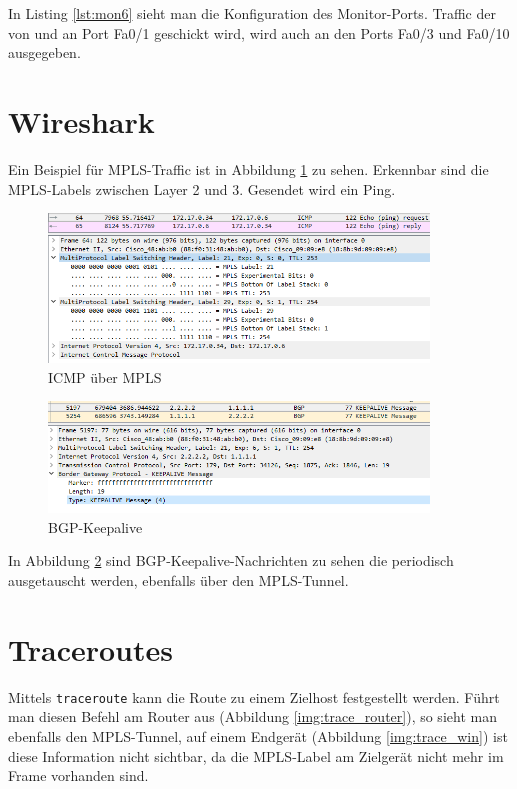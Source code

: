 In Listing \ref{lst:mon6} sieht man die Konfiguration des Monitor-Ports. Traffic der von und an Port Fa0/1 geschickt wird, wird auch an den Ports Fa0/3 und Fa0/10 ausgegeben.

\section{Wireshark}

Ein Beispiel für \ac{MPLS}-Traffic ist in Abbildung \ref{img:icmp} zu sehen. Erkennbar sind die MPLS-Labels zwischen Layer 2 und 3. Gesendet wird ein Ping.

\begin{figure}[H]
	\centering
	\includegraphics[width=0.9\textwidth]{img/icmp_wireshark.png}
	\caption{ICMP über MPLS}
	\label{img:icmp}
\end{figure}

\begin{figure}[H]
	\centering
	\includegraphics[width=0.9\textwidth]{img/bgp_wireshark.png}
	\caption{BGP-Keepalive}
	\label{img:bgp}
\end{figure}

In Abbildung \ref{img:bgp} sind \ac{BGP}-Keepalive-Nachrichten zu sehen die periodisch ausgetauscht werden, ebenfalls über den \ac{MPLS}-Tunnel.

\section{Traceroutes}

Mittels \texttt{traceroute} kann die Route zu einem Zielhost festgestellt werden. Führt man diesen Befehl am Router aus (Abbildung \ref{img:trace_router}), so sieht man ebenfalls den \ac{MPLS}-Tunnel, auf einem Endgerät (Abbildung \ref{img:trace_win}) ist diese Information nicht sichtbar, da die MPLS-Label am Zielgerät nicht mehr im Frame vorhanden sind.

